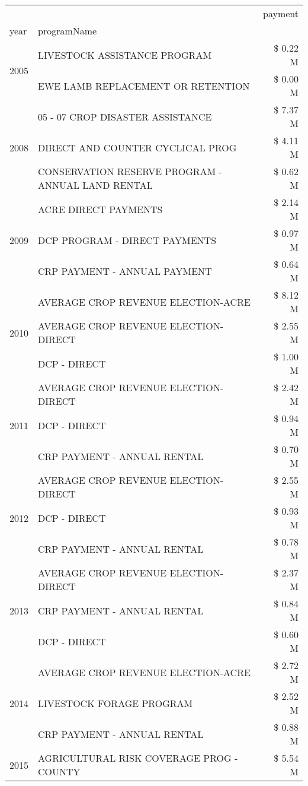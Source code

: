 \begin{tabular}{llr}
\toprule
 &  & payment \\
year & programName &  \\
\midrule
\multirow[t]{2}{*}{2005} & LIVESTOCK ASSISTANCE PROGRAM & \$ 0.22 M \\
 & EWE LAMB REPLACEMENT OR RETENTION & \$ 0.00 M \\
\cline{1-3}
\multirow[t]{3}{*}{2008} & 05 - 07 CROP DISASTER ASSISTANCE & \$ 7.37 M \\
 & DIRECT AND COUNTER CYCLICAL PROG & \$ 4.11 M \\
 & CONSERVATION RESERVE PROGRAM - ANNUAL LAND RENTAL & \$ 0.62 M \\
\cline{1-3}
\multirow[t]{3}{*}{2009} & ACRE DIRECT PAYMENTS & \$ 2.14 M \\
 & DCP PROGRAM - DIRECT PAYMENTS & \$ 0.97 M \\
 & CRP PAYMENT - ANNUAL PAYMENT & \$ 0.64 M \\
\cline{1-3}
\multirow[t]{3}{*}{2010} & AVERAGE CROP REVENUE ELECTION-ACRE & \$ 8.12 M \\
 & AVERAGE CROP REVENUE ELECTION-DIRECT & \$ 2.55 M \\
 & DCP - DIRECT & \$ 1.00 M \\
\cline{1-3}
\multirow[t]{3}{*}{2011} & AVERAGE CROP REVENUE ELECTION-DIRECT & \$ 2.42 M \\
 & DCP - DIRECT & \$ 0.94 M \\
 & CRP PAYMENT - ANNUAL RENTAL & \$ 0.70 M \\
\cline{1-3}
\multirow[t]{3}{*}{2012} & AVERAGE CROP REVENUE ELECTION-DIRECT & \$ 2.55 M \\
 & DCP - DIRECT & \$ 0.93 M \\
 & CRP PAYMENT - ANNUAL RENTAL & \$ 0.78 M \\
\cline{1-3}
\multirow[t]{3}{*}{2013} & AVERAGE CROP REVENUE ELECTION-DIRECT & \$ 2.37 M \\
 & CRP PAYMENT - ANNUAL RENTAL & \$ 0.84 M \\
 & DCP - DIRECT & \$ 0.60 M \\
\cline{1-3}
\multirow[t]{3}{*}{2014} & AVERAGE CROP REVENUE ELECTION-ACRE & \$ 2.72 M \\
 & LIVESTOCK FORAGE PROGRAM & \$ 2.52 M \\
 & CRP PAYMENT - ANNUAL RENTAL & \$ 0.88 M \\
\cline{1-3}
\multirow[t]{3}{*}{2015} & AGRICULTURAL RISK COVERAGE PROG - COUNTY & \$ 5.54 M \\

\end{tabular}
